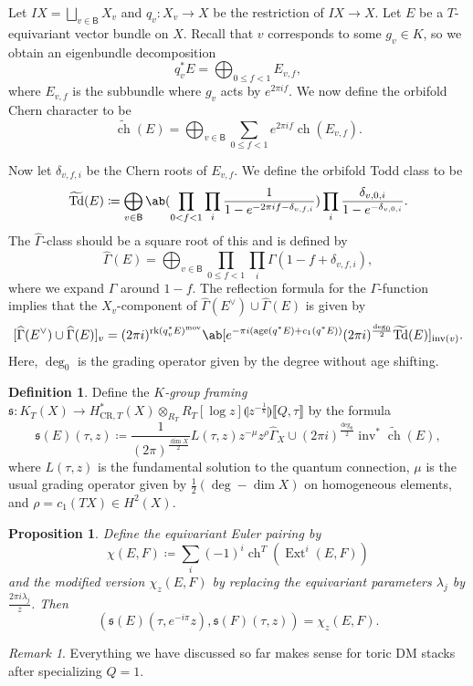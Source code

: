 \documentclass{amsart}
\newtheorem{prop}[thm]{Proposition}
\theoremstyle{definition}
\newtheorem{defn}[thm]{Definition}
\theoremstyle{remark}
\newtheorem{rmk}[thm]{Remark}
\theoremstyle{plain}
\theoremstyle{definition}
\theoremstyle{remark}
\newcommand{\mf}[1]{\mathfrak{#1}}
\newcommand{\mr}[1]{\mathrm{#1}}
\newcommand{\on}[1]{\operatorname{#1}}
\newcommand{\ms}[1]{\mathsf{#1}}
\newcommand{\wt}[1]{\widetilde{#1}}
\newcommand{\wh}[1]{\widehat{#1}}
\newcommand{\1}{\mathbf{1}}
\newcommand{\2}{\mathbf{2}}
\newcommand{\3}{\mathbf{3}}
\newcommand{\ch}{\on{ch}}
\DeclareMathOperator{\Ext}{Ext}
\begin{document}
Let $IX = \bigsqcup_{v \in \ms{B}} X_v$ and $q_v \colon X_v \to X$ be the restriction of $IX \to X$. Let $E$ be a $T$-equivariant vector bundle on $X$. Recall that $v$ corresponds to some $g_v \in K$, so we obtain an eigenbundle decomposition
\[ q_v^* E = \bigoplus_{0 \leq f < 1} E_{v,f}, \]
where $E_{v,f}$ is the subbundle where $g_v$ acts by $e^{2 \pi i f}$. We now define the orbifold Chern character to be
\[ \wt{\ch}(E) = \bigoplus_{v \in\ms{B}} \sum_{0 \leq f < 1} e^{2\pi i f} \ch(E_{v,f}). \]

Now let $\delta_{v,f,i}$ be the Chern roots of $E_{v,f}$. We define the orbifold Todd class to be
\[ \wt{\mr{Td}}(E) \coloneqq \bigoplus_{v \in \ms{B}} \ab(\prod_{0 < f < 1} \prod_{i} \frac{1}{1-e^{-2\pi i f - \delta_{v,f,i}}}) \prod_i \frac{\delta_{v,0,i}}{1-e^{-\delta_{v,0,i}}}. \]
The $\wh{\Gamma}$-class should be a square root of this and is defined by
\[ \wh{\Gamma}(E) = \bigoplus_{v \in \ms{B}} \prod_{0 \leq f < 1} \prod_i \Gamma(1-f+\delta_{v,f,i}), \]
where we expand $\Gamma$ around $1-f$. The reflection formula for the $\Gamma$-function implies that the $X_v$-component of $\wh{\Gamma}(E^{\vee}) \cup \wh{\Gamma}(E)$ is given by
\[ [\wh{\Gamma}(E^{\vee}) \cup \wh{\Gamma}(E)]_v = (2\pi i)^{\on{rk} (q_v^* E)^{\mr{mov}}} \ab[e^{-\pi i ( \on{age}(q^* E) + c_1(q^* E) )} (2\pi i)^{\frac{\deg_0}{2}} \wt{\mr{Td}}(E)]_{\on{inv}(v)}. \]
Here, $\deg_0$ is the grading operator given by the degree without age shifting.

\begin{defn}
    Define the \textit{$K$-group framing} $\mf{s} \colon K_T(X) \to H^*_{\mr{CR},T}(X) \otimes_{R_T} R_T[\log z] \llparenthesis z^{-\frac{1}{k}} \rrparenthesis \llbracket Q,\tau \rrbracket$ by the formula
    \[ \mf{s}(E)(\tau, z) \coloneqq \frac{1}{(2\pi)^{\frac{\dim X}{2}}} L(\tau, z) z^{-\mu} z^{\rho} \wh{\Gamma}_X \cup (2\pi i)^{\frac{\deg_0}{2}} \on{inv}^* \wt{\ch}(E), \]
    where $L(\tau, z)$ is the fundamental solution to the quantum connection, $\mu$ is the usual grading operator given by $\frac{1}{2} (\deg - \dim X)$ on homogeneous elements, and $\rho = c_1(TX) \in H^2(X)$.
\end{defn}

\begin{prop}
    Define the equivariant Euler pairing by
    \[ \chi(E,F) \coloneqq \sum_{i} (-1)^i \ch^T(\Ext^i(E,F)) \]
    and the modified version $\chi_z(E,F)$ by replacing the equivariant parameters $\lambda_j$ by $\frac{2\pi i \lambda_j}{z}$. Then
    \[ (\mf{s}(E)(\tau, e^{-i\pi}z), \mf{s}(F)(\tau, z)) = \chi_z(E,F). \]
\end{prop}

\begin{rmk}
    Everything we have discussed so far makes sense for toric DM stacks after specializing $Q=1$.
\end{rmk}
\end{document}
